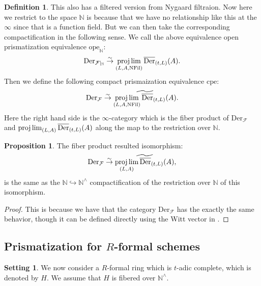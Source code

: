\documentclass[12pt]{article}
\theoremstyle{definition}
\newtheorem{definition}{Definition}
\newtheorem{setting}{Setting}
\newtheorem{proposition}{Proposition}
\begin{document}
\begin{definition}
This also has a filtered version from Nygaard filtraion. Now here we restrict to the space $\mathbb{N}$ is because that we have no relationship like this at the $\infty$ since that is a function field. But we can then take the corresponding compactification in the following sense. We call the above equivalence open prismatization equivalence $\mathrm{ope}_\mathbb{N}$:
\begin{align}
\mathrm{Der}_{\mathcal{F}|_{\mathbb{N}}}\overset{\sim}{\rightarrow} \projlim_{(L,A,\mathrm{NFil})}\overline{\mathrm{Der}}_{(t,L)}(A).
\end{align}
Then we define the following compact prismaization equivalence $\mathrm{cpe}$:
\begin{align}
\mathrm{Der}_{\mathcal{F}}\overset{\sim}{\rightarrow} \widetilde{\projlim_{(L,A,\mathrm{NFil})}\overline{\mathrm{Der}}_{(t,L)}(A)}.
\end{align}
Here the right hand side is the $\infty$-category which is the fiber product of $\mathrm{Der}_{\mathcal{F}}$ and $\projlim_{(L,A)}\overline{\mathrm{Der}}_{(t,L)}(A)$ along the map to the restriction over $\mathbb{N}$. \end{definition}


\begin{proposition}
The fiber product resulted isomorphism:
\begin{align}
\mathrm{Der}_{\mathcal{F}}\overset{\sim}{\rightarrow} \widetilde{\projlim_{(L,A)}\overline{\mathrm{Der}}_{(t,L)}(A)},
\end{align}
is the same as the $\mathbb{N}\hookrightarrow \mathbb{N}^\wedge$ compactification of the restriction over $\mathbb{N}$ of this isomorphism.
\end{proposition}

\begin{proof}
This is because we have that the category $\mathrm{Der}_{\mathcal{F}}$ has the exactly the same behavior, though it can be defined directly using the Witt vector in \cite{2LH}.
\end{proof}








\subsection{Prismatization for $R$-formal schemes}

\begin{setting}
We now consider a $R$-formal ring which is $t$-adic complete, which is denoted by $H$. We assume that $H$ is fibered over $\mathbb{N}^\wedge$.
\end{setting}
\end{document}

